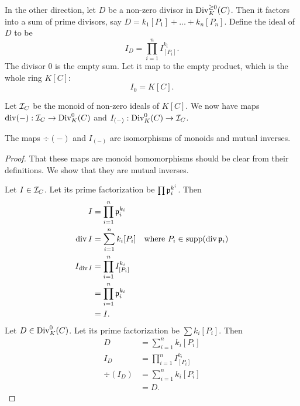 In the other direction, let $D$ be a non-zero divisor in $\Div_K^{\geq 0}(C)$.
Then it factors into a sum of prime divisors, say $D = k_1[P_1] + \dots + k_n[P_n]$.
Define the ideal of $D$ to be
\[ I_D = \prod_{i=1}^n I_{[P_i]}^{k_i}. \]
The divisor 0 is the empty sum.
Let it map to the empty product, which is the whole ring $K[C]$:
\[ I_{0} = K[C]. \]

Let $\cal I_C$ be the monoid of non-zero ideals of $K[C]$.
We now have maps $\div(-) : \cal I_C \to \Div_K^0(C)$ and $I_{(-)} : \Div_K^0(C) \to \cal I_C$.
\begin{theorem}
  The maps $\div(-)$ and $I_{(-)}$ are isomorphisms of monoids and mutual inverses.
\end{theorem}
\begin{proof}
  That these maps are monoid homomorphisms should be clear from their definitions.
  We show that they are mutual inverses.

  Let $I \in \cal I_C$. Let its prime factorization be $\prod \frak p_i^{k^i}$. Then
  \begin{align*}
    I &= \prod_{i=1}^n \frak p_i^{k_i} \\
    \div I &= \sum_{i=1}^n k_i[P_i]
      & \text{where }P_i \in \supp(\div \frak p_i) \\
    I_{\div I} &= \prod_{i=1}^n I_{[P_i]}^{k_i} \\
               &= \prod_{i=1}^n \frak p_i^{k_i} \\
               &= I.
  \end{align*}
  Let $D \in \Div_K^0(C)$. Let its prime factorization be $\sum k_i[P_i]$. Then
  \begin{align*}
    D &= \sum_{i=1}^n k_i[P_i] \\
    I_D &= \prod_{i=1}^n I_{[P_i]}^{k_i} \\
    \div(I_D) &= \sum_{i=1}^n k_i [P_i] \\ &= D.
  \end{align*}
\end{proof}
\begin{comment}
\begin{proof}
  The proof is quite immediate after factoring each ideal.
  It has already been established that $\div$ maps the identity $K[C]$ of $\cal I_C$ to the identity $0$ of $\Div_K^0(C)$.
  Let $\frak a$ and $\frak b$ be non-zero ideals with prime factorizations
  \[ \frak a = \prod \frak p_i^{k_i}, ~~~ \frak b = \prod \frak q_i^{\ell_i}. \]
  Then
  \begin{align*}
    \div (\frak a \frak b)
      &= \div \left( \left( \prod \frak p_i^{k_i} \right) \left( \prod \frak q_j^{\ell_j} \right) \right) \\
      &= \sum k_i \div \frak p_i + \sum \ell_j \div \frak q_i \\
      &= \div \frak a + \div \frak b.
  \end{align*}
\end{proof}
\end{comment}



